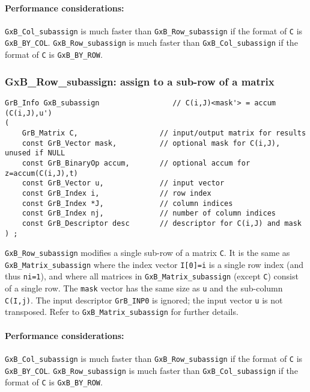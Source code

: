 \documentclass[12pt]{article}
\begin{document}
\paragraph{\bf Performance considerations:} %
\verb'GxB_Col_subassign' is much faster than \verb'GxB_Row_subassign' if the
format of \verb'C' is \verb'GxB_BY_COL'.  \verb'GxB_Row_subassign' is much
faster than \verb'GxB_Col_subassign' if the format of \verb'C' is
\verb'GxB_BY_ROW'.

\subsubsection{{\sf GxB\_Row\_subassign:} assign to a sub-row of a matrix}
\label{subassign_row}

\begin{mdframed}[userdefinedwidth=6in]
{\footnotesize
\begin{verbatim}
GrB_Info GxB_subassign                 // C(i,J)<mask'> = accum (C(i,J),u')
(
    GrB_Matrix C,                   // input/output matrix for results
    const GrB_Vector mask,          // optional mask for C(i,J), unused if NULL
    const GrB_BinaryOp accum,       // optional accum for z=accum(C(i,J),t)
    const GrB_Vector u,             // input vector
    const GrB_Index i,              // row index
    const GrB_Index *J,             // column indices
    const GrB_Index nj,             // number of column indices
    const GrB_Descriptor desc       // descriptor for C(i,J) and mask
) ;
\end{verbatim} } \end{mdframed}

\verb'GxB_Row_subassign' modifies a single sub-row of a matrix \verb'C'.  It is
the same as \verb'GxB_Matrix_subassign' where the index vector \verb'I[0]=i' is
a single row index (and thus \verb'ni=1'), and where all matrices in
\verb'GxB_Matrix_subassign' (except \verb'C') consist of a single row.  The
\verb'mask' vector has the same size as \verb'u' and the sub-column
\verb'C(I,j)'.  The input descriptor \verb'GrB_INP0' is ignored; the input
vector \verb'u' is not transposed.  Refer to \verb'GxB_Matrix_subassign' for
further details.

\paragraph{\bf Performance considerations:} %
\verb'GxB_Col_subassign' is much faster than \verb'GxB_Row_subassign' if the
format of \verb'C' is \verb'GxB_BY_COL'.  \verb'GxB_Row_subassign' is much
faster than \verb'GxB_Col_subassign' if the format of \verb'C' is
\verb'GxB_BY_ROW'.
\end{document}
